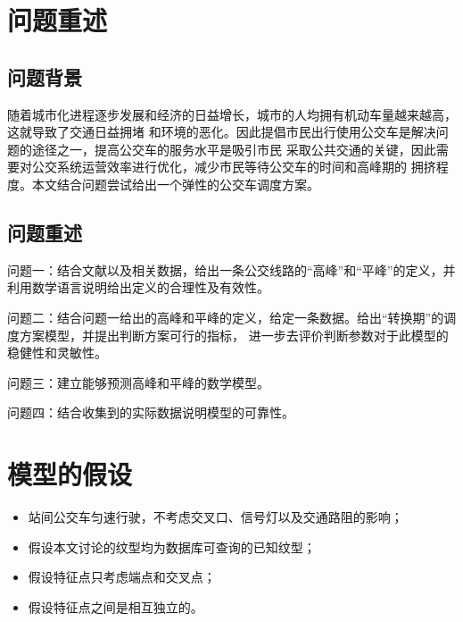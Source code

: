 \documentclass{whutmod}
\begin{document}
\begin{spacing}{1.2}
\begin{abstract}
本文的优点为：1.将复杂的指纹识别问题转化为经典的指派问题，极大简化了问题的复杂程度；2.通过0-1变量的非线性项线性化，提高了模型
的求解速度；3.对指纹图像进行了充分的预处理，保证了后续分析的准确性。


\end{abstract}

\tableofcontents
\newpage

\section{问题重述}

\subsection{问题背景}
随着城市化进程逐步发展和经济的日益增长，城市的人均拥有机动车量越来越高，这就导致了交通日益拥堵
和环境的恶化。因此提倡市民出行使用公交车是解决问题的途径之一，提高公交车的服务水平是吸引市民
采取公共交通的关键，因此需要对公交系统运营效率进行优化，减少市民等待公交车的时间和高峰期的
拥挤程度。本文结合问题尝试给出一个弹性的公交车调度方案。


\subsection{问题重述}

问题一：结合文献以及相关数据，给出一条公交线路的“高峰”和“平峰”的定义，并利用数学语言说明给出定义的合理性及有效性。


问题二：结合问题一给出的高峰和平峰的定义，给定一条数据。给出“转换期”的调度方案模型，并提出判断方案可行的指标，
进一步去评价判断参数对于此模型的稳健性和灵敏性。

问题三：建立能够预测高峰和平峰的数学模型。

问题四：结合收集到的实际数据说明模型的可靠性。


\section{模型的假设}

\begin{itemize}
	\item 站间公交车匀速行驶，不考虑交叉口、信号灯以及交通路阻的影响；
	\item 假设本文讨论的纹型均为数据库可查询的已知纹型；
	\item 假设特征点只考虑端点和交叉点；
	\item 假设特征点之间是相互独立的。
\end{itemize}


\end{spacing}
\end{document}
